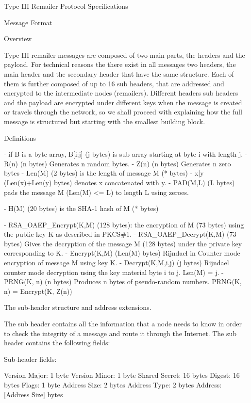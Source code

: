 Type III Remailer Protocol Specifications

Message Format

Overview 

Type III remailer messages are composed of two main parts, the
headers and the payload. For technical reasons the there exist in
all messages two headers, the main header and the secondary header
that have the same structure. Each of them is further composed of up
to 16 sub headers, that are addressed and encrypted to the
intermediate nodes (remailers). Different headers sub headers and the
payload are encrypted under different keys when the message is created
or travels through the network, so we shall proceed with explaining
how the full message is structured but starting with the smallest
building block. 

Definitions

- if B is a byte array, B[i:j] (j bytes) is sub array starting at 
  byte i with length j.
- R(n) (n bytes) Generates n random bytes.
- Z(n) (n bytes) Generates n zero bytes
- Len(M) (2 bytes) is the length of message M (* bytes)
- x|y (Len(x)+Len(y) bytes) denotes x concatenated with y.
- PAD(M,L) (L bytes) pads the message M (Len(M) <= L) to length L
  using zeroes.

- H(M) (20 bytes) is the SHA-1 hash of M (* bytes)

- RSA_OAEP_Encrypt(K,M) (128 bytes): the encryption of M (73
  bytes) using the public key K as described in PKCS\#1.
- RSA_OAEP_Decrypt(K,M) (73 bytes) Gives the decryption of the
  message M (128 bytes) under the private key corresponding to K.
- Encrypt(K,M) (Len(M) bytes) Rijndael in Counter mode encryption 
  of message M using key K. 
- Decrypt(K,M,i,j) (j bytes) Rijndael counter mode decryption 
  using the key material byte i to j. Len(M) = j.
- PRNG(K, n) (n bytes) Produces n bytes of pseudo-random numbers.
  PRNG(K, n) = Encrypt(K, Z(n))

The sub-header structure and address extensions.

The sub header contains all the information that a node needs to know
in order to check the integrity of a message and route it through the
Internet. The sub header contains the following fields: 

Sub-header fields:

Version Major: 1 byte
Version Minor: 1 byte
Shared Secret: 16 bytes
Digest:        16 bytes
Flags:         1 byte
Address Size:  2 bytes
Address Type:  2 bytes
Address:       [Address Size] bytes


